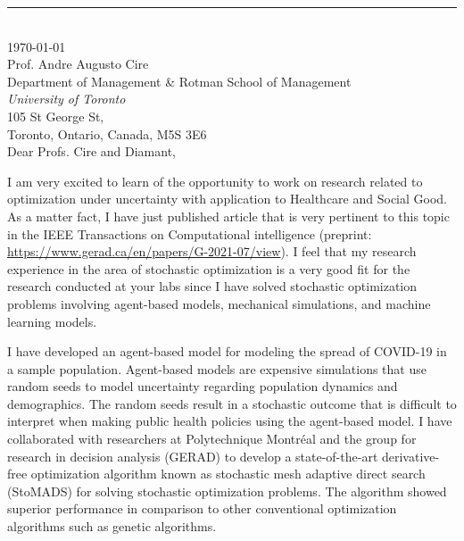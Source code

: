 \documentclass[12pt]{article} %
\begin{document}
\medskip %
\rule[0pt]{\textwidth}{1pt}\\
\today\\[6pt]
Prof. Andre Augusto Cire\\
Department of Management \& Rotman School of Management\\
\textit{University of Toronto}\\
105 St George St,\\
Toronto, Ontario, Canada, M5S 3E6\\[6pt] \medskip
Dear Profs. Cire and Diamant,


\medskip %
I am very excited to learn of the opportunity to work on research related to optimization under uncertainty with application to Healthcare and Social Good. As a matter fact, I have just published article that is very pertinent to this topic in the IEEE Transactions on Computational intelligence (preprint: \href{https://www.gerad.ca/en/papers/G-2021-07/view}{https://www.gerad.ca/en/papers/G-2021-07/view}). I feel that my research experience in the area of stochastic optimization is a very good fit for the research conducted at your labs since I have solved stochastic optimization problems involving agent-based models, mechanical simulations, and machine learning models.

\medskip %

I have developed an agent-based model for modeling the spread of COVID-19 in a sample population. Agent-based models are expensive simulations that use random seeds to model uncertainty regarding population dynamics and demographics. The random seeds result in a stochastic outcome that is difficult to interpret when making public health policies using the agent-based model. I have collaborated with researchers at Polytechnique Montréal and the group for research in decision analysis (GERAD) to develop a state-of-the-art derivative-free optimization algorithm known as stochastic mesh adaptive direct search (StoMADS) for solving stochastic optimization problems. The algorithm showed superior performance in comparison to other conventional optimization algorithms such as genetic algorithms.
\end{document}
